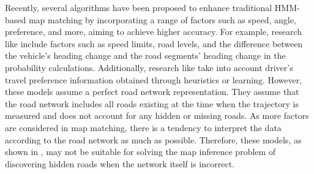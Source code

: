 \documentclass[preprint,12pt]{elsarticle}
\begin{document}
Recently, several algorithms have been proposed to enhance traditional HMM-based map matching by incorporating a range of factors such as speed, angle, preference, and more, aiming to achieve higher accuracy. For example, research like \cite{song2012quick,atia2017low,mohamed2016accurate,fu2021online} include factors such as speed limits, road levels, and the difference between the vehicle's heading change and the road segments' heading change in the probability calculations. Additionally, research like \cite{fu2021online,reinforce,routechoice} take into account driver's travel preference information obtained through heuristics or learning.
However, these models assume a perfect road network representation. They assume that the road network includes all roads existing at the time when the trajectory is measured and does not account for any hidden or missing roads. As more factors are considered in map matching, there is a tendency to interpret the data according to the road network as much as possible. Therefore, these models, as shown in \cite{wang2013crowdatlas}, may not be suitable for solving the map inference problem of discovering hidden roads when the network itself is incorrect.
\end{document}
